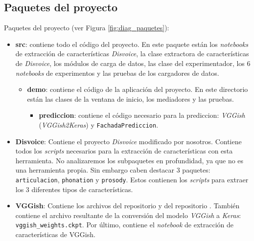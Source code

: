 \subsection{Paquetes del proyecto}
Paquetes del proyecto (ver Figura \ref{fig:diag_paquetes}):
\begin{itemize}
\item \textbf{src}: contiene todo el código del proyecto. En este paquete están los \textit{notebooks} de extracción de características \textit{Disvoice}, la clase extractora de características de \textit{Disvoice}, los módulos de carga de datos, las clase del experimentador, los 6 \textit{notebooks} de experimentos y  las pruebas de los cargadores de datos.
	\begin{itemize}
	\item \textbf{demo}: contiene el código de la aplicación del proyecto. En este directorio están las clases de la ventana de inicio, los mediadores y las pruebas.
		\begin{itemize}
		\item \textbf{prediccion}: contiene el código necesario para la prediccion: \textit{VGGish} (\textit{VGGish2Keras}) y \texttt{FachadaPrediccion}.
		\end{itemize}
	\end{itemize}
	\item \textbf{Disvoice}: Contiene el proyecto \textit{Disvoice} modificado por nosotros. Contiene todos los \textit{scripts} necesarios para la extracción de características con esta herramienta. No analizaremos los subpaquetes en profundidad, ya que no es una herramienta propia. Sin embargo caben destacar 3 paquetes: \texttt{articulacion}, \texttt{phonation} y \texttt{prosody}. Estos contienen los \textit{scripts} para extraer los 3 diferentes tipos de características.
	\item \textbf{VGGish}: Contiene los archivos del repositorio  y del repositorio . También contiene el archivo resultante de la conversión del modelo \textit{VGGish} a \textit{Keras}: \texttt{vggish\_weights.ckpt}. Por último, contiene el \textit{notebook} de extracción de características de VGGish.
\end{itemize}




